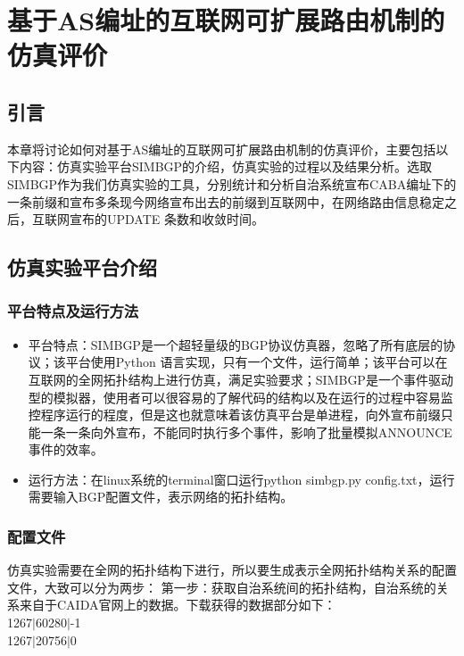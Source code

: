 

\chapter{基于AS编址的互联网可扩展路由机制的仿真评价}
\label{cha:simu}
\section{引言}
本章将讨论如何对基于AS编址的互联网可扩展路由机制的仿真评价，主要包括以下内容：仿真实验平台SIMBGP的介绍，仿真实验的过程以及结果分析。选取SIMBGP作为我们仿真实验的工具，分别统计和分析自治系统宣布CABA编址下的一条前缀和宣布多条现今网络宣布出去的前缀到互联网中，在网络路由信息稳定之后，互联网宣布的UPDATE 条数和收敛时间。

\section{仿真实验平台介绍}
\subsection{平台特点及运行方法}
\begin{itemize}
\item 平台特点：SIMBGP是一个超轻量级的BGP协议仿真器，忽略了所有底层的协议；该平台使用Python 语言实现，只有一个文件，运行简单；该平台可以在互联网的全网拓扑结构上进行仿真，满足实验要求；SIMBGP是一个事件驱动型的模拟器，使用者可以很容易的了解代码的结构以及在运行的过程中容易监控程序运行的程度，但是这也就意味着该仿真平台是单进程，向外宣布前缀只能一条一条向外宣布，不能同时执行多个事件，影响了批量模拟ANNOUNCE事件的效率。
\item 运行方法：在linux系统的terminal窗口运行python simbgp.py  config.txt，运行需要输入BGP配置文件，表示网络的拓扑结构。
\end{itemize}

\subsection{配置文件}
\label{subsect:config}
仿真实验需要在全网的拓扑结构下进行，所以要生成表示全网拓扑结构关系的配置文件，大致可以分为两步：
第一步：获取自治系统间的拓扑结构，自治系统的关系来自于CAIDA官网上的数据。下载获得的数据部分如下：\\
1267$|$60280$|$-1\\
1267$|$20756$|$0

